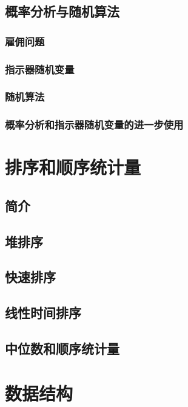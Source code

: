 \documentclass[lang=cn,newtx,10pt,scheme=chinese]{elegantbook}
\begin{document}
\chapter{概率分析与随机算法}

\section{雇佣问题}

\section{指示器随机变量}

\section{随机算法}

\section{概率分析和指示器随机变量的进一步使用}

\part{排序和顺序统计量}

\chapter{简介}

\chapter{堆排序}

\chapter{快速排序}

\chapter{线性时间排序}

\chapter{中位数和顺序统计量}

\part{数据结构}
\end{document}
